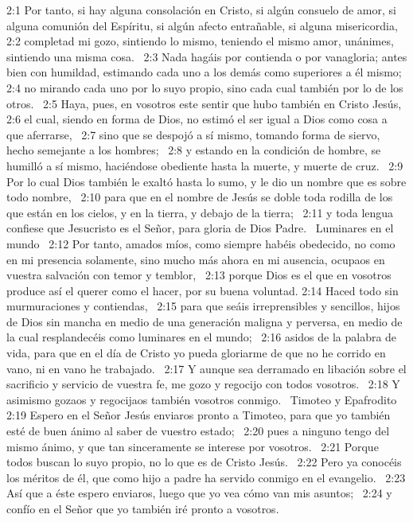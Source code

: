 2:1 Por tanto, si hay alguna consolación en Cristo, si algún consuelo de amor, si alguna comunión del Espíritu, si algún afecto entrañable, si alguna misericordia,  
2:2 completad mi gozo, sintiendo lo mismo, teniendo el mismo amor, unánimes, sintiendo una misma cosa.  
2:3 Nada hagáis por contienda o por vanagloria; antes bien con humildad, estimando cada uno a los demás como superiores a él mismo;  
2:4 no mirando cada uno por lo suyo propio, sino cada cual también por lo de los otros.  
2:5 Haya, pues, en vosotros este sentir que hubo también en Cristo Jesús,  
2:6 el cual, siendo en forma de Dios, no estimó el ser igual a Dios como cosa a que aferrarse,  
2:7 sino que se despojó a sí mismo, tomando forma de siervo, hecho semejante a los hombres;  
2:8 y estando en la condición de hombre, se humilló a sí mismo, haciéndose obediente hasta la muerte, y muerte de cruz.  
2:9 Por lo cual Dios también le exaltó hasta lo sumo, y le dio un nombre que es sobre todo nombre,  
2:10 para que en el nombre de Jesús se doble toda rodilla de los que están en los cielos, y en la tierra, y debajo de la tierra;  
2:11 y toda lengua confiese que Jesucristo es el Señor, para gloria de Dios Padre.  
Luminares en el mundo  
2:12 Por tanto, amados míos, como siempre habéis obedecido, no como en mi presencia solamente, sino mucho más ahora en mi ausencia, ocupaos en vuestra salvación con temor y temblor,  
2:13 porque Dios es el que en vosotros produce así el querer como el hacer, por su buena voluntad. 
2:14 Haced todo sin murmuraciones y contiendas,  
2:15 para que seáis irreprensibles y sencillos, hijos de Dios sin mancha en medio de una generación maligna y perversa, en medio de la cual resplandecéis como luminares en el mundo;  
2:16 asidos de la palabra de vida, para que en el día de Cristo yo pueda gloriarme de que no he corrido en vano, ni en vano he trabajado.  
2:17 Y aunque sea derramado en libación sobre el sacrificio y servicio de vuestra fe, me gozo y regocijo con todos vosotros.  
2:18 Y asimismo gozaos y regocijaos también vosotros conmigo.  
Timoteo y Epafrodito  
2:19 Espero en el Señor Jesús enviaros pronto a Timoteo, para que yo también esté de buen ánimo al saber de vuestro estado;  
2:20 pues a ninguno tengo del mismo ánimo, y que tan sinceramente se interese por vosotros.  
2:21 Porque todos buscan lo suyo propio, no lo que es de Cristo Jesús.  
2:22 Pero ya conocéis los méritos de él, que como hijo a padre ha servido conmigo en el evangelio.  
2:23 Así que a éste espero enviaros, luego que yo vea cómo van mis asuntos;  
2:24 y confío en el Señor que yo también iré pronto a vosotros.  

